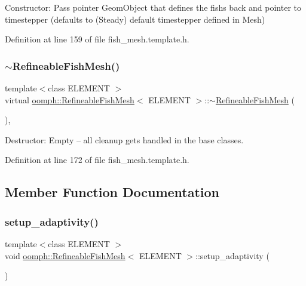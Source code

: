 Constructor\+: Pass pointer Geom\+Object that defines the fish\textquotesingle{}s back and pointer to timestepper (defaults to (Steady) default timestepper defined in Mesh) 



Definition at line 159 of file fish\+\_\+mesh.\+template.\+h.

\mbox{\label{classoomph_1_1RefineableFishMesh_a8304d093e015001a6d56faebdd2d4636}} 
\subsubsection{\texorpdfstring{$\sim$\+Refineable\+Fish\+Mesh()}{~RefineableFishMesh()}}
{\footnotesize\ttfamily template$<$class E\+L\+E\+M\+E\+NT $>$ \\
virtual \hyperlink{classoomph_1_1RefineableFishMesh}{oomph\+::\+Refineable\+Fish\+Mesh}$<$ E\+L\+E\+M\+E\+NT $>$\+::$\sim$\hyperlink{classoomph_1_1RefineableFishMesh}{Refineable\+Fish\+Mesh} (\begin{DoxyParamCaption}{ }\end{DoxyParamCaption})\hspace{0.3cm}{\ttfamily [inline]}, {\ttfamily [virtual]}}



Destructor\+: Empty -- all cleanup gets handled in the base classes. 



Definition at line 172 of file fish\+\_\+mesh.\+template.\+h.



\subsection{Member Function Documentation}
\mbox{\label{classoomph_1_1RefineableFishMesh_a1fb10f94f78c7a4e37113fbf4c72f00c}} 
\subsubsection{\texorpdfstring{setup\+\_\+adaptivity()}{setup\_adaptivity()}}
{\footnotesize\ttfamily template$<$class E\+L\+E\+M\+E\+NT $>$ \\
void \hyperlink{classoomph_1_1RefineableFishMesh}{oomph\+::\+Refineable\+Fish\+Mesh}$<$ E\+L\+E\+M\+E\+NT $>$\+::setup\+\_\+adaptivity (\begin{DoxyParamCaption}{ }\end{DoxyParamCaption})\hspace{0.3cm}{\ttfamily [protected]}}



